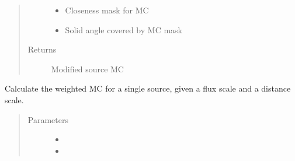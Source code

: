 \documentclass[letterpaper,10pt,english]{sphinxmanual}
\begin{document}
\begin{fulllineitems}
\begin{fulllineitems}
\begin{quote}
\begin{description}
\begin{itemize}
\item {} 
 \textendash{} Closeness mask for MC

\item {} 
 \textendash{} Solid angle covered by MC mask

\end{itemize}

\item[{Returns}] \leavevmode
Modified source MC

\end{description}\end{quote}

\end{fulllineitems}


\begin{fulllineitems}
\label{\detokenize{index:flarestack.core.injector.MCInjector.calculate_n_exp_single}}
\end{fulllineitems}


\begin{fulllineitems}
\label{\detokenize{index:flarestack.core.injector.MCInjector.calculate_single_source}}
Calculate the weighted MC for a single source, given a flux scale
and a distance scale.
\begin{quote}\begin{description}
\item[{Parameters}] \leavevmode\begin{itemize}
\item {} 
 \textendash{} 

\item {} 
 \textendash{} 

\end{itemize}


\end{description}
\end{quote}
\end{fulllineitems}
\end{fulllineitems}
\end{document}

